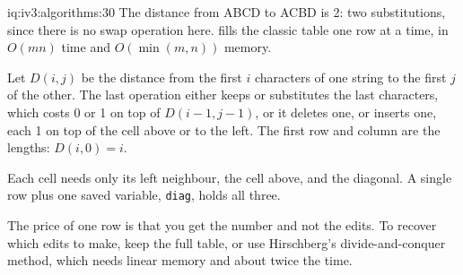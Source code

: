 \begin{solution}{iq:iv3:algorithms:30}
The distance from ABCD to ACBD is 2: two substitutions, since there is no swap operation here.  fills the classic table one row at a time, in $O(mn)$ time and $O(\min(m, n))$ memory.
\label{lst:iv3:al:edit}

Let $D(i, j)$ be the distance from the first $i$ characters of one string to the first $j$ of the other. The last operation either keeps or substitutes the last characters, which costs 0 or 1 on top of $D(i - 1, j - 1)$, or it deletes one, or inserts one, each 1 on top of the cell above or to the left. The first row and column are the lengths: $D(i, 0) = i$.

Each cell needs only its left neighbour, the cell above, and the diagonal. A single row plus one saved variable, \texttt{diag}, holds all three.

The price of one row is that you get the number and not the edits. To recover which edits to make, keep the full table, or use Hirschberg's divide-and-conquer method, which needs linear memory and about twice the time.

\end{solution}

